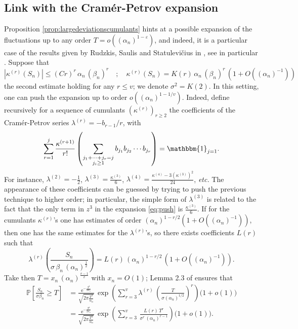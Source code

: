 \documentclass[12pt,a4paper,reqno]{amsart}
\theoremstyle{remark}
\newcommand{\E}{\mathrm{e}}
\newcommand{\proba}{\mathbb{P}}
\newcommand{\eps}{\varepsilon}
\newcommand{\alphan}{\alpha_n}
\newcommand{\betan}{\beta_n}
\begin{document}
\subsection{Link with the Cram\'er-Petrov expansion}
Proposition \ref{prop:largedeviationscumulants} hints at a possible expansion of the fluctuations up to any order $T=o((\alphan)^{1-\eps})$, and indeed, it is a particular case of the results given by Rudzkis, Saulis and Statulevi\v{c}ius in \cite{RSS78,SS91}, see in particular \cite[Lemma 2.3]{SS91}. Suppose that
$$|\kappa^{(r)}(S_{n})|\leq (Cr)^{r}\,\alphan\,(\betan)^{r}\quad;\quad \kappa^{(r)}(S_{n})=K(r)\,\alphan\,(\betan)^{r}\,(1+O((\alphan)^{-1}))$$
the second estimate holding for any $r \leq v$; we denote $\sigma^{2}=K(2)$. In this setting, one can push the expansion up to order $o((\alphan)^{1-1/v})$. Indeed, define recursively for a sequence of cumulants $(\kappa^{(r)})_{r \geq 2}$ the coefficients of the Cram\'er-Petrov series $\lambda^{(r)}=-b_{r-1}/r$, with
$$\sum_{r=1}^{j} \frac{\kappa^{(r+1)}}{r!}\left(\sum_{\substack{j_{1}+\cdots+j_{r}=j\\ j_{i} \geq 1}} b_{j_{1}}b_{j_{2}}\cdots b_{j_{r}}\right)=\mathbbm{1}_{j=1}.$$
For instance, $\lambda^{(2)}=-\frac{1}{2}$, $\lambda^{(3)}=\frac{\kappa^{(3)}}{6}$, $\lambda^{(4)}=\frac{\kappa^{(4)}-3(\kappa^{(3)})^{2}}{24}$, \emph{etc.} The appearance of these coefficients can be guessed by trying to push the previous technique to higher order; in particular, the simple form of $\lambda^{(3)}$ is related to the fact that the only term in $z^{3}$ in the expansion \eqref{eq:push} is $\frac{\kappa^{(3)}}{6}$. If for the cumulants $\kappa^{(r)}$'s one has estimates of order $(\alphan)^{1-r/2}(1+O((\alphan)^{-1}))$, then one has the same estimates for the $\lambda^{(r)}$'s, so there exists coefficients $L(r)$ such that
$$\lambda^{(r)}\left(\frac{S_{n}}{\sigma\,\betan\,(\alphan)^{\frac{1}{2}}}\right)=L(r)\,(\alphan)^{1-r/2}\,(1+O((\alphan)^{-1})).$$ 
Take then $T=x_n\,(\alphan)^{\frac{v-1}{v}}$ with $x_n=O(1)$; Lemma 2.3 of \cite{SS91} ensures that 
\begin{align*}\proba\left[\frac{S_{n}}{\sigma\betan}\geq T\right]&=\frac{\E^{-\frac{T^{2}}{2\alphan}}}{\sqrt{2\pi\frac{T^{2}}{\alphan}}}\,\exp\left(\sum_{r=3}^{v} \lambda^{(r)}\,\left(\frac{T}{\sigma (\alphan)^{1/2}}\right)^{r}\right) \big(1+o(1)\big)\\
&=\frac{\E^{-\frac{T^{2}}{2\alphan}}}{\sqrt{2\pi\frac{T^{2}}{\alphan}}}\,\exp\left(\sum_{r=3}^{v} \,\frac{L(r)\,T^{r}}{\sigma^{r}\,(\alphan)^{r-1}}\right) \big(1+o(1)\big).
\end{align*}
\end{document}
